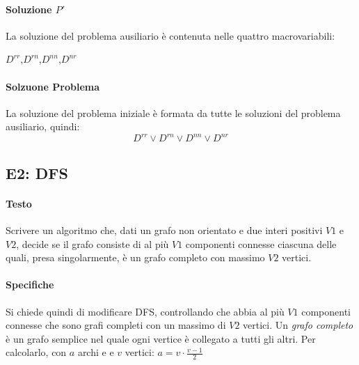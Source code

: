 \documentclass[12pt, a4paper, openany]{book}
\begin{document}
\paragraph*{Soluzione $P'$}
La soluzione del problema ausiliario è contenuta nelle quattro macrovariabili:
\begin{center}
	$D^{rr}$,$D^{rn}$,$D^{nn}$,$D^{nr}$
\end{center}
\paragraph*{Solzuone Problema}
La soluzione del problema iniziale è formata da tutte le soluzioni del problema ausiliario, quindi:
$$
D^{rr}\vee D^{rn}\vee D^{nn}\vee D^{nr}
$$

\subsection{E2: DFS}
\paragraph*{Testo}
Scrivere un algoritmo che, dati un grafo non orientato e due interi positivi $V1$ e $V2$, 
decide se il grafo consiste di al più $V1$ componenti connesse ciascuna delle quali, presa singolarmente, è un grafo completo con massimo $V2$ vertici. 

\paragraph*{Specifiche}
Si chiede quindi di modificare DFS, controllando che abbia al più $V1$ componenti connesse che sono grafi completi con un massimo di $V2$ vertici.
Un \emph{grafo completo} è un grafo semplice nel quale ogni vertice è collegato a tutti gli altri. Per calcolarlo, con $a$ archi e e $v$ vertici: $a = v\cdot \frac{v-1}{2}$  
\end{document}
